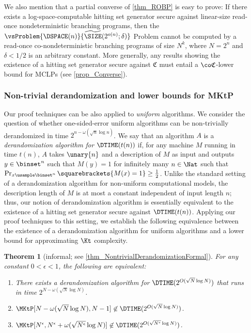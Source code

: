 \documentclass[11pt]{article}
\numberwithin{equation}{section}
\newtheorem{theorem}{Theorem}[section]
\theoremstyle{definition}
\theoremstyle{plain}
\begin{document}
We also mention that
a partial converse of \cref{thm_ROBP} is easy to prove:
If there exists a log-space-computable hitting set generator secure
against linear-size read-once nondeterministic branching programs,
then the $\vsProblem {\DSPACE(n)} { \widetilde{\SIZE}(2^{o(n)}; \delta) }$ Problem
cannot be computed by a read-once co-nondeterministic branching programs
of size $N^k$, where $N = 2^n$ and $\delta < 1 / 2$ is an arbitrary constant.
More generally, any results showing the existence of a hitting set generator
secure against $\mathfrak{C}$
must entail
a $\co \mathfrak{C}$-lower bound for MCLPs
%
(see \cref{prop_Converse}). %

%
%
%
%
%
%
%
%
%
%
%
%
%
%
%

\subsubsection{Non-trivial derandomization and lower bounds for MKtP}

Our proof techniques can be also applied to \emph{uniform} algorithms.
We consider the question of whether one-sided-error uniform algorithms can be non-trivially derandomized in time $2^{n - \omega(\sqrt{n} \log n)}$.
We say that an algorithm $A$ is a \emph{derandomization algorithm for $\DTIME(t(n))$} if,
for any machine $M$ running in time $t(n)$,
$A$ takes $\unary{n}$ and a description of $M$ as input
and
outputs $y \in \binset^n$ such that $M(y) = 1$
for infinitely many $n \in \Nat$ such that
$\Pr_{x \usample \binset^n} \squarebrackets{ M(x) = 1 } \ge \frac{1}{2}$.
Unlike the standard setting of a derandomization algorithm for non-uniform computational models,
the description length of $M$ is at most a constant independent of input length $n$; thus, our notion of derandomization algorithm is essentially equivalent
to the existence of a hitting set generator secure against $\DTIME(t(n))$.
Applying our proof techniques to this setting,
we establish the following equivalence between the existence of a derandomization algorithm for uniform algorithms and
a lower bound for approximating $\Kt$ complexity.


\begin{theorem}
  [informal; see \cref{thm_NontrivialDerandomizationFormal}]
  \label{thm_NontrivialDerandomizationInformal}
  For any constant $0 < \epsilon < 1$,
  the following are equivalent:
  \begin{enumerate}
    \item
          There exists a derandomization algorithm for $\DTIME(2^{O(\sqrt{N} \log N)})$ that runs in time $2^{N - \omega( \sqrt{N} \log N )}$.
    \item
          $\MKtP[N - \omega( \sqrt{N} \log N ), N-1] \not\in \DTIME(2^{O( \sqrt{N} \log N )})$.
    \item
          $\MKtP[N^{\epsilon}, N^{\epsilon} + \omega( \sqrt{N^{\epsilon}} \log N )] \not\in \DTIME(2^{O( \sqrt{N^{\epsilon}} \log N )})$.
  \end{enumerate}
\end{theorem}
\end{document}
